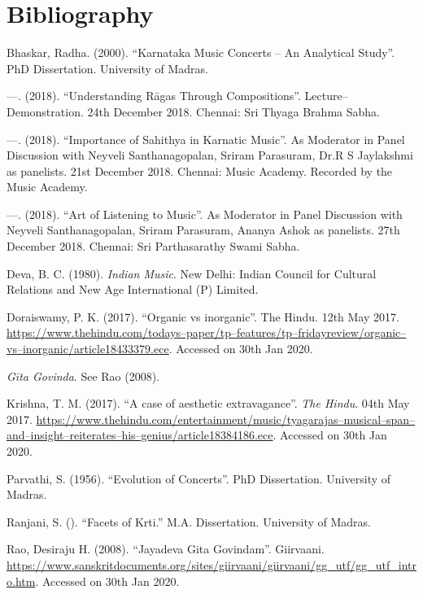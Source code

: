 \section*{Bibliography}

\begin{thebibliography}{99}
 Bhaskar, Radha. (2000). “Karnataka Music Concerts – An Analytical Study”. PhD Dissertation. University of Madras.

  —. (2018). “Understanding Rāgas Through Compositions”. Lecture–Demonstration. 24th December 2018. Chennai: Sri Thyaga Brahma Sabha.

  —. (2018). “Importance of Sahithya in Karnatic Music”. As Moderator in Panel Discussion with Neyveli Santhanagopalan, Sriram Parasuram, Dr.R S Jaylakshmi as panelists. 21st December 2018. Chennai: Music Academy. Recorded by the Music Academy.

  —. (2018). “Art of Listening to Music”. As Moderator in Panel Discussion with Neyveli Santhanagopalan, Sriram Parasuram, Ananya Ashok as panelists. 27th December 2018. Chennai: Sri Parthasarathy Swami Sabha.

  Deva, B. C. (1980). \textit{Indian Music}. New Delhi: Indian Council for Cultural Relations and New Age International (P) Limited.

  Doraiswamy, P. K. (2017). “Organic vs inorganic”. The Hindu. 12th May 2017. \url{https://www.thehindu.com/todays–paper/tp–features/tp–fridayreview/organic–vs–inorganic/article18433379.ece}. Accessed on 30th Jan 2020.

  \textit{Gīta Govinda}. See Rao (2008).

  Krishna, T. M. (2017). “A case of aesthetic extravagance”. \textit{The Hindu}. 04th May 2017. \url{https://www.thehindu.com/entertainment/music/tyagarajas–musical–span–and–insight–reiterates–his–genius/article18384186.ece}. Accessed on 30th Jan 2020.

  Parvathi, S. (1956). “Evolution of Concerts”. PhD Dissertation. University of Madras.

  Ranjani, S. (). “Facets of Krti.” M.A. Dissertation. University of Madras.

  Rao, Desiraju H. (2008). “Jayadeva Gita Govindam”. Giirvaani. \url{https://www.sanskritdocuments.org/sites/giirvaani/giirvaani/gg_utf/gg_utf_intro.htm}. Accessed on 30th Jan 2020.


\end{thebibliography}
